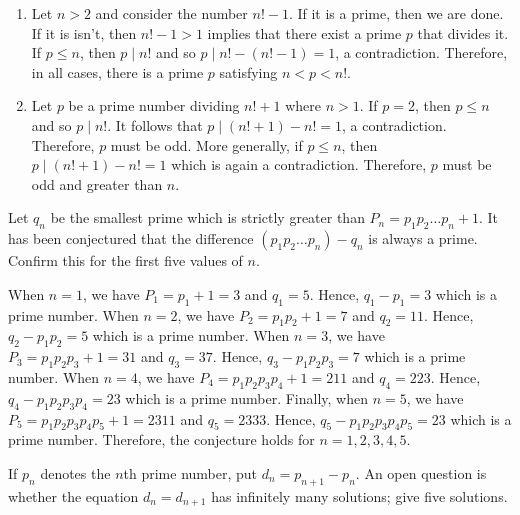 \begin{solution}
    \begin{enumerate}
        \item Let $n > 2$ and consider the number $n! - 1$. If it is a prime, then we are done. If it is isn't, then $n!-1 > 1$ implies that there exist a prime $p$ that divides it. If $p \leq n$, then $p \mid n!$ and so $p \mid n! - (n!-1) = 1$, a contradiction. Therefore, in all cases, there is a prime $p$ satisfying $n < p < n!$.
        \item Let $p$ be a prime number dividing $n! + 1$ where $n > 1$. If $p = 2$, then $p \leq n$ and so $p \mid n!$. It follows that $p \mid (n! + 1) - n! = 1$, a contradiction. Therefore, $p$ must be odd. More generally, if $p \leq n$, then $p \mid (n!+1) - n! = 1$ which is again a contradiction. Therefore, $p$ must be odd and greater than $n$.
    \end{enumerate}
\end{solution}

\begin{exercise}
    Let $q_n$ be the smallest prime which is strictly greater than $P_n = p_1p_2 \dots p_n + 1$. It has been conjectured that the difference $(p_1p_2 \dots p_n) - q_n$ is always a prime. Confirm this for the first five values of $n$. \\
\end{exercise}

\begin{solution}
    When $n = 1$, we have $P_1 = p_1 + 1 = 3$ and $q_1 = 5$. Hence, $q_1 - p_1 = 3$ which is a prime number. When $n = 2$, we have $P_2 = p_1p_2 + 1 = 7$ and $q_2 = 11$. Hence, $q_2 - p_1p_2 = 5$ which is a prime number. When $n = 3$, we have $P_3 = p_1p_2p_3 + 1 = 31$ and $q_3 = 37$. Hence, $q_3 - p_1p_2p_3 = 7$ which is a prime number. When $n = 4$, we have $P_4 = p_1p_2p_3p_4 + 1 = 211$ and $q_4 = 223$. Hence, $q_4 - p_1p_2p_3p_4 = 23$ which is a prime number. Finally, when $n = 5$, we have $P_5 = p_1p_2p_3p_4p_5 + 1 = 2311$ and $q_5 = 2333$. Hence, $q_5 - p_1p_2p_3p_4p_5 = 23$ which is a prime number. Therefore, the conjecture holds for $n = 1,2,3,4,5$. \\
\end{solution}

\begin{exercise}
    If $p_n$ denotes the $n$th prime number, put $d_n = p_{n+1} - p_n$. An open question is whether the equation $d_n = d_{n+1}$ has infinitely many solutions; give five solutions. \\
\end{exercise}

